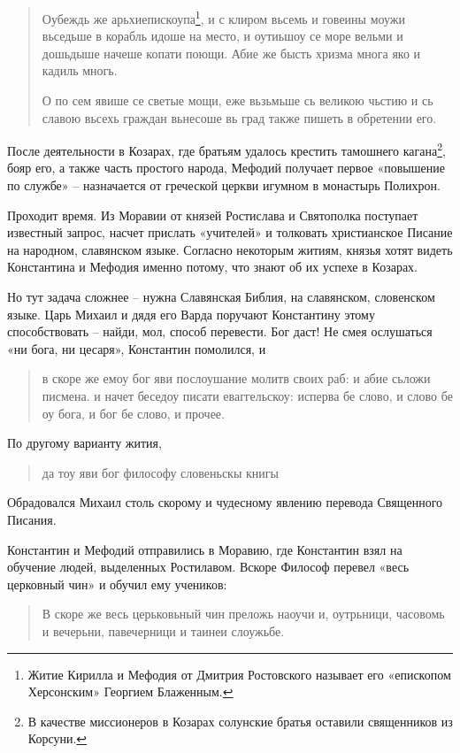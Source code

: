 \documentclass[a5paper,11pt,openany]{article}
\begin{document}
\begin{quotation}
Оубеждь же арьхиепискоупа\footnote{Житие Кирилла и Мефодия от Дмитрия Ростовского называет его «епископом Херсонским» Георгием Блаженным.}, и с клиром вьсемь и говеины моужи вьседьше в корабль идоше на место, и оутиьшоу се море вельми и дошьдыше начеше копати поющи. Абие же бысть хризма многа яко и кадиль многь.

О по сем явише се светые мощи, еже вьзьмьше сь великою чьстию и сь славою вьсехь граждан вьнесоше вь град также пишеть в обретении его.
\end{quotation}

После деятельности в Козарах, где братьям удалось крестить тамошнего кагана\footnote{В качестве миссионеров в Козарах солунские братья оставили священников из Корсуни.}, бояр его, а также часть простого народа, Мефодий получает первое «повышение по службе» – назначается от греческой церкви игумном в монастырь Полихрон.

Проходит время. Из Моравии от князей Ростислава и Святополка поступает известный запрос, насчет прислать «учителей» и толковать христианское Писание на народном, славянском языке. Согласно некоторым житиям, князья хотят видеть Константина и Мефодия именно потому, что знают об их успехе в Козарах.

Но тут задача сложнее – нужна Славянская Библия, на славянском, словенском языке. Царь Михаил и дядя его Варда поручают Константину этому способствовать – найди, мол, способ перевести. Бог даст! Не смея ослушаться «ни бога, ни цесаря», Константин помолился, и 

\begin{quotation}
в скоре же емоу бог яви послоушание молитв своих раб: и абие сьложи писмена. и начет беседоу писати еваггельскоу: исперва бе слово, и слово бе оу бога, и бог бе слово, и прочее.
\end{quotation}

По другому варианту жития,

\begin{quotation}
да тоу яви бог философу словеньскы книгы
\end{quotation}

Обрадовался Михаил столь скорому и чудесному явлению перевода Священного Писания.

Константин и Мефодий отправились в Моравию, где Константин взял на обучение людей, выделенных Ростилавом. Вскоре Философ перевел «весь церковный чин» и обучил ему учеников:

\begin{quotation}
В скоре же весь церьковьный чин преложь наоучи и, оутрьници, часовомь и вечерьни, павечерници и таинеи слоужьбе.
\end{quotation}
\end{document}

